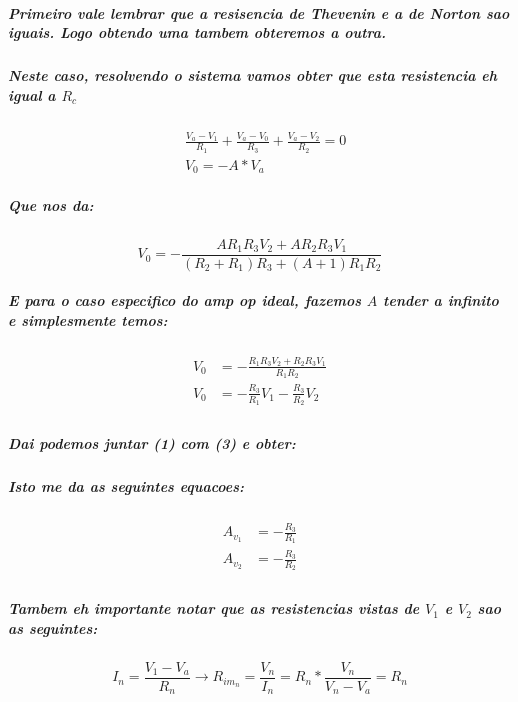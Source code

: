 \documentclass[12pt,twoside, a4paper, twocolumn]{article}
\begin{document}
\subparagraph*{Primeiro vale lembrar que a resisencia de Thevenin e a de Norton sao iguais. Logo obtendo uma tambem obteremos a outra.
}

\subparagraph*{Neste caso, resolvendo o sistema vamos obter que esta resistencia eh igual a $R_{c}$}

\begin{equation}
    \begin{aligned}
         & \frac{V_a - V_1}{R_1} + \frac{V_a-V_0}{R_3} + \frac{V_a-V_2}{R_2} = 0 \\
         & V_0 = -A*V_a
    \end{aligned}
\end{equation}

\subparagraph*{Que nos da:}

\begin{equation}
    V_0 = -\frac{A R_1 R_3 V_2 + A R_2 R_3 V_1}{(R_2 + R_1)R_3 + (A + 1) R_1 R_2}
\end{equation}

\subparagraph*{E para o caso especifico do amp op ideal, fazemos $A$ tender a infinito e simplesmente temos:}

\begin{equation}
    \begin{aligned}
        V_0 & = -\frac{R_1 R_3 V_2 + R_2 R_3 V_1}{R_1 R_2} \\
        V_0 & = - \frac{R_3}{R_1}V_1 - \frac{R_3}{R_2}V_2  \\
    \end{aligned}
\end{equation}

\subparagraph*{Dai podemos juntar (1) com (3) e obter:}

\subparagraph*{Isto me da as seguintes equacoes:}

\begin{equation}
    \begin{aligned}
        A_{v_1} & = -\frac{R_3}{R_1} \\
        A_{v_2} & = -\frac{R_3}{R_2} \\
    \end{aligned}
\end{equation}


\subparagraph*{Tambem eh importante notar que as resistencias vistas de $V_1$ e $V_2$ sao as seguintes:}
\begin{equation}
    I_n = \frac{V_1-V_a}{R_n} \rightarrow R_{im_n} = \frac
    {V_n}{I_n} = R_n * \frac{V_n}{V_n - V_a} = R_n
\end{equation}
\end{document}
